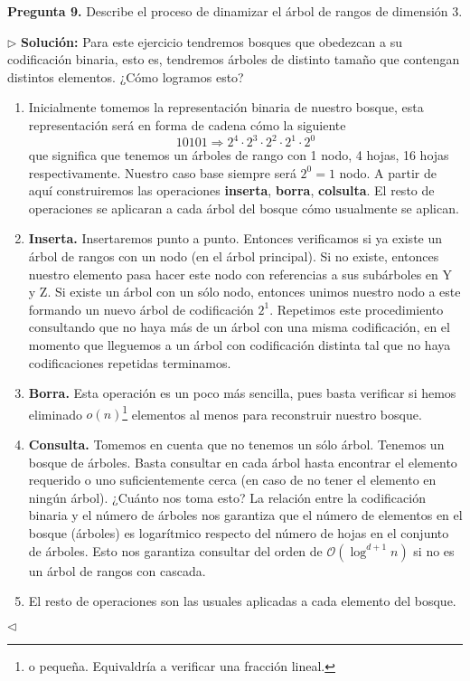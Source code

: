 \textbf{Pregunta 9.} Describe el proceso de dinamizar el árbol de rangos de dimensión 3.

$\rhd$ \textbf{Solución:} Para este ejercicio tendremos bosques que obedezcan a su codificación
binaria, esto es, tendremos árboles de distinto tamaño que contengan distintos elementos. ¿Cómo
logramos esto?

\begin{enumerate}
\item Inicialmente tomemos la representación binaria de nuestro bosque, esta representación será
en forma de cadena cómo la siguiente
\[10101 \Rightarrow 2^4 \cdot 2^3 \cdot 2^2 \cdot 2^1 \cdot 2^0\]
que significa que tenemos un árboles de rango con 1 nodo, 4 hojas, 16 hojas respectivamente. Nuestro caso base
siempre será $2^0 = 1$ nodo. A partir de aquí construiremos las operaciones \textbf{inserta}, \textbf{borra}, \textbf{colsulta}. El resto de operaciones
se aplicaran a cada árbol del bosque cómo usualmente se aplican.
\item \textbf{Inserta.} Insertaremos punto a punto. Entonces verificamos si ya existe un árbol de rangos con un nodo (en el árbol principal).
Si no existe, entonces nuestro elemento pasa hacer este nodo con referencias a sus subárboles en Y y Z. Si existe un árbol con un sólo nodo,
entonces unimos nuestro nodo a este formando un nuevo árbol de codificación $2^1$. Repetimos este procedimiento consultando que no haya más de un
árbol con una misma codificación, en el momento que lleguemos a un árbol con codificación distinta tal que no haya codificaciones repetidas terminamos.
\item \textbf{Borra.} Esta operación es un poco más sencilla, pues basta verificar si hemos eliminado $o(n)$\footnote{o pequeña. Equivaldría a verificar una fracción lineal.} elementos al menos para reconstruir
nuestro bosque.
\item \textbf{Consulta.} Tomemos en cuenta que no tenemos un sólo árbol. Tenemos un bosque de árboles. Basta consultar en cada árbol hasta
encontrar el elemento requerido o uno suficientemente cerca (en caso de no tener el elemento en ningún árbol). ¿Cuánto nos toma esto? La
relación entre la codificación binaria y el número de árboles nos garantiza que el número de elementos en el bosque (árboles) es logarítmico
respecto del número de hojas en el conjunto de árboles. Esto nos garantiza consultar del orden de $\mathcal{O}(\log^{d + 1} n)$ si no es un
árbol de rangos con cascada.
\item El resto de operaciones son las usuales aplicadas a cada elemento del bosque.
\end{enumerate}

\hfill $\lhd$
